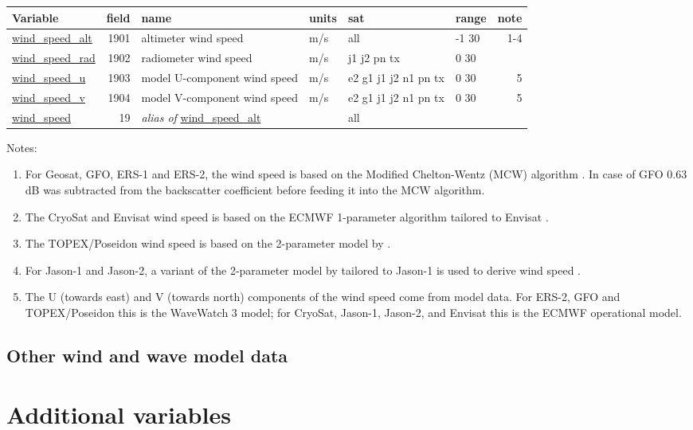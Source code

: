 \documentclass[a4paper,11pt,openany,natbib]{thesis}
\makeatletter
\newcommand\var[1]{\url{#1}\index{variables!#1@\protect\url{#1}}}
\newcommand\alias[1]{\emph{alias of} \var{#1}}
\newenvironment{vartable}{
\begin{table}[ht]
\small
\begin{tabular}{lrllllr}
\hline
Variable & field & name & units & sat & range & note \\
\hline
}{
\hline
\end{tabular}
\end{table}
}
\makeatother
\begin{document}
\begin{vartable}
\var{wind_speed_alt} & 1901 & altimeter wind speed & m/s & all & -1 30 & 1-4 \\
\var{wind_speed_rad} & 1902 & radiometer wind speed & m/s & j1 j2 pn tx & 0 30 & \\
\var{wind_speed_u}   & 1903 & model U-component wind speed & m/s & e2 g1 j1 j2 n1 pn tx & 0 30 & 5 \\ 
\var{wind_speed_v}   & 1904 & model V-component wind speed & m/s & e2 g1 j1 j2 n1 pn tx & 0 30 & 5 \\ 
\hline
\var{wind_speed} & 19 & \alias{wind_speed_alt} && all && \\
\end{vartable}

Notes:
\begin{enumerate}
\item For Geosat, GFO, ERS-1 and ERS-2, the wind speed is based on the Modified Chelton-Wentz (MCW) algorithm \citep{witter1991}. In case of GFO 0.63 dB was subtracted from the backscatter coefficient before feeding it into the MCW algorithm.
\item The CryoSat and Envisat wind speed is based on the ECMWF 1-parameter algorithm tailored to Envisat \citep{abdalla2007}.
\item The TOPEX/Poseidon wind speed is based on the 2-parameter model by \citet{gourrion2002b}. 
\item For Jason-1 and Jason-2, a variant of the 2-parameter model by \citet{gourrion2002b} tailored to Jason-1 is used to derive wind speed \citep{collard2004}.
\item The U (towards east) and V (towards north) components of the wind speed come from model data. For ERS-2, GFO and TOPEX/Poseidon this is the WaveWatch 3 model; for CryoSat, Jason-1, Jason-2, and Envisat this is the ECMWF operational model.
\end{enumerate}

\section{Other wind and wave model data}


\chapter{Additional variables}
\end{document}
